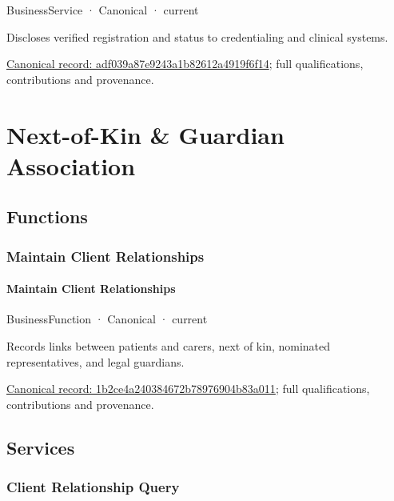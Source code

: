 \label{element:adf039a87e9243a1b82612a4919f6f14}
{\small BusinessService · Canonical · current}\par

Discloses verified registration and status to credentialing and clinical systems.


{\footnotesize \href{../../../../continuum/business/business-service/adf039a87e9243a1b82612a4919f6f14.md}{Canonical record: adf039a87e9243a1b82612a4919f6f14}; full qualifications, contributions and provenance.}\par
\section{Next-of-Kin \& Guardian Association}

\subsection{Functions}

\subsubsection{Maintain Client Relationships}

\paragraph{Maintain Client Relationships}

\label{element:1b2ce4a240384672b78976904b83a011}
{\small BusinessFunction · Canonical · current}\par

Records links between patients and carers, next of kin, nominated representatives, and legal guardians.


{\footnotesize \href{../../../../continuum/business/business-function/1b2ce4a240384672b78976904b83a011.md}{Canonical record: 1b2ce4a240384672b78976904b83a011}; full qualifications, contributions and provenance.}\par
\subsection{Services}

\subsubsection{Client Relationship Query}

